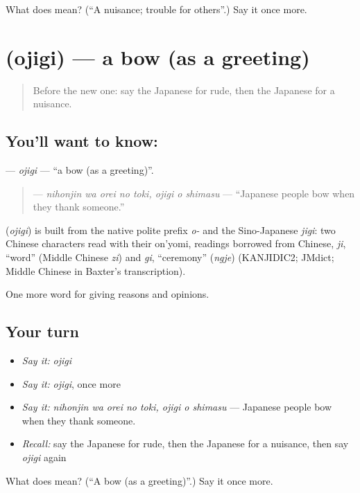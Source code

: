 \begin{tcolorbox}[breakable,colback=teal!4,colframe=teal!35!black,title={Before you move on}]
What does  mean? (\textquotedblleft{}A nuisance; trouble for others\textquotedblright{}.) Say it once more.
\end{tcolorbox}
\section[\texorpdfstring{\ja{おじぎ} (ojigi)}{おじぎ (ojigi)}]{ (ojigi) — a bow (as a greeting)}

\label{lesson:JA-C327-ojigi}



\begin{quote}
Before the new one: say the Japanese for rude, then the Japanese for a nuisance.
\end{quote}

\subsection*{You'll want to know: }
\textbf{} — \emph{ojigi} — \textquotedblleft{}a bow (as a greeting)\textquotedblright{}.

\begin{quote}
\textbf{   } — \emph{nihonjin wa orei no toki, ojigi o shimasu} — \textquotedblleft{}Japanese people bow when they thank someone.\textquotedblright{}
\end{quote}

\begin{cousinweb}
\textbf{} (\emph{ojigi}) is built from the native polite prefix \emph{o-} and the Sino-Japanese \emph{jigi}: two Chinese characters read with their on'yomi, readings borrowed from Chinese, \emph{ji}, \textquotedblleft{}word\textquotedblright{} (Middle Chinese \emph{zi}) and \emph{gi}, \textquotedblleft{}ceremony\textquotedblright{} (\emph{ngje}) (KANJIDIC2; JMdict; Middle Chinese in Baxter's transcription).
\end{cousinweb}

\begin{grammarlens}[title={What you've built}]
One more word for giving reasons and opinions.
\end{grammarlens}

\subsection*{Your turn}
\begin{itemize}
\raggedright
  \item \emph{Say it:} \emph{ojigi}
  \item \emph{Say it:} \emph{ojigi}, once more
  \item \emph{Say it:} \emph{nihonjin wa orei no toki, ojigi o shimasu} — Japanese people bow when they thank someone.
  \item \emph{Recall:} say the Japanese for rude, then the Japanese for a nuisance, then say \emph{ojigi} again
\end{itemize}

\begin{tcolorbox}[breakable,colback=teal!4,colframe=teal!35!black,title={Before you move on}]
What does  mean? (\textquotedblleft{}A bow (as a greeting)\textquotedblright{}.) Say it once more.
\end{tcolorbox}
